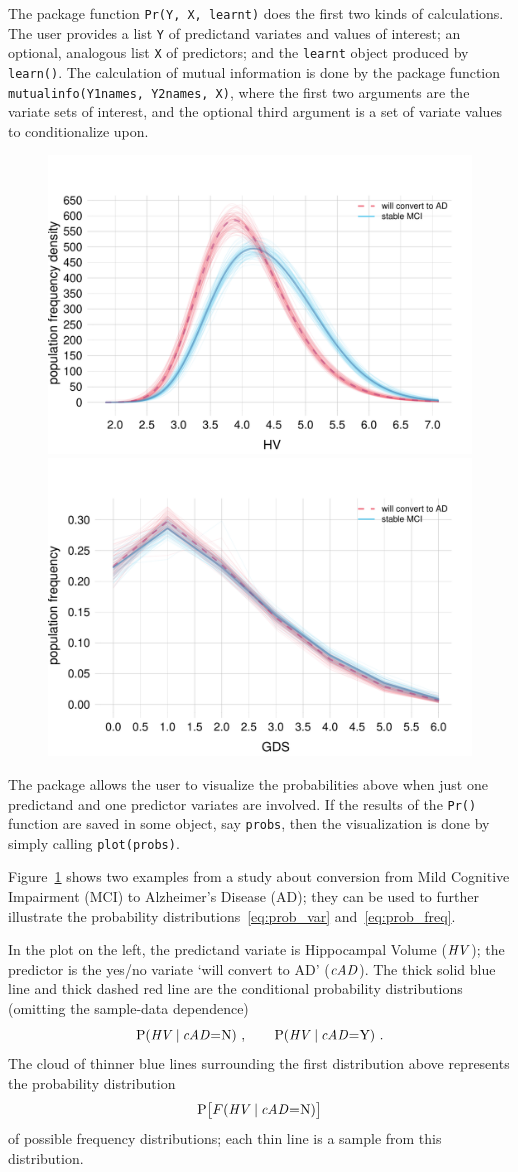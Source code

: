 The package function \texttt{Pr(Y, X, learnt)} does the first two kinds of calculations. The user provides a list \texttt{Y} of predictand variates and values of interest; an optional, analogous list \texttt{X} of predictors; and the \texttt{learnt} object produced by \texttt{learn()}. The calculation of mutual information is done by the package function \texttt{mutualinfo(Y1names, Y2names, X)}, where the first two arguments are the variate sets of interest, and the optional third argument is a set of variate values to conditionalize upon.

\medskip

\begin{figure}[t]
\centering%
\includegraphics[width=0.45\linewidth]{figures/population_distr_HV.pdf}\hfill%
\includegraphics[width=0.45\linewidth]{figures/population_distr_GDS.pdf}%
\\ \caption{}\label{fig:distr}
\end{figure}
The package allows the user to visualize the probabilities above when just one predictand and one predictor variates are involved. If the results of the \texttt{Pr()} function are saved in some object, say \texttt{probs}, then the visualization is done by simply calling \texttt{plot(probs)}.

Figure~\ref{fig:distr} shows two examples from a study \citep{portamanaetal2023b} about conversion from Mild Cognitive Impairment (MCI) to Alzheimer's Disease (AD); they can be used to further illustrate the probability distributions~\eqref{eq:prob_var} and~\eqref{eq:prob_freq}.

In the plot on the left, the predictand variate is Hippocampal Volume ($\mathit{HV}$); the predictor is the yes/no variate `will convert to AD' ($\mathit{cAD}$). The thick solid blue line and thick dashed red line are the conditional probability distributions (omitting the sample-data dependence)
\begin{equation*}
  \P( \HV \| \cAD \mo \yn)\ ,\qquad
  \P( \HV \| \cAD \mo \yy) \ .
\end{equation*}
The cloud of thinner blue lines surrounding the first distribution above  represents the probability distribution
\begin{equation*}
  \P\bigl[ \yF(\HV \| \cAD \mo \yn)\bigr]
\end{equation*}
of possible frequency distributions; each thin line is a sample from this distribution.

